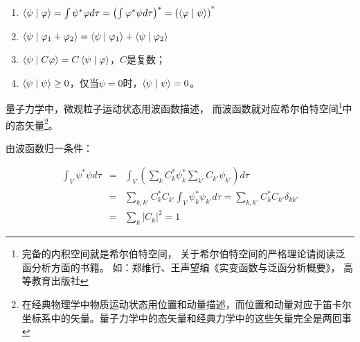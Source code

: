 \begin{enumerate}
    \item $\left\langle {\psi }
 \mathrel{\left | {\vphantom {\psi  \varphi }}
 \right. \kern-\nulldelimiterspace}
 {\varphi } \right\rangle  = \int {\psi ^* \varphi d\tau  = \left( {\int {\varphi ^* \psi d\tau } } \right)^*  = \left( {\left\langle {\varphi }
 \mathrel{\left | {\vphantom {\varphi  \psi }}
 \right. \kern-\nulldelimiterspace}
 {\psi } \right\rangle } \right)} ^* $

    \item $\left\langle {\psi }
 \mathrel{\left | {\vphantom {\psi  {\varphi _1  + \varphi _2 }}}
 \right. \kern-\nulldelimiterspace}
 {{\varphi _1  + \varphi _2 }} \right\rangle  = \left\langle {\psi }
 \mathrel{\left | {\vphantom {\psi  {\varphi _1 }}}
 \right. \kern-\nulldelimiterspace}
 {{\varphi _1 }} \right\rangle  + \left\langle {\psi }
 \mathrel{\left | {\vphantom {\psi  {\varphi _2 }}}
 \right. \kern-\nulldelimiterspace}
 {{\varphi _2 }} \right\rangle $

    \item $\left\langle {\psi }
 \mathrel{\left | {\vphantom {\psi  {C\varphi }}}
 \right. \kern-\nulldelimiterspace}
 {{C\varphi }} \right\rangle  = C\left\langle {\psi }
 \mathrel{\left | {\vphantom {\psi  \varphi }}
 \right. \kern-\nulldelimiterspace}
 {\varphi } \right\rangle $，$C$是复数；

    \item $\left\langle {\psi }
 \mathrel{\left | {\vphantom {\psi  \psi }}
 \right. \kern-\nulldelimiterspace}
 {\psi } \right\rangle  \ge 0$，仅当$\psi  = 0$时，$\left\langle {\psi }
 \mathrel{\left | {\vphantom {\psi  \psi }}
 \right. \kern-\nulldelimiterspace}
 {\psi } \right\rangle  = 0$。
   \end{enumerate}

量子力学中，微观粒子运动状态用波函数描述，
而波函数就对应希尔伯特空间\footnote{完备的内积空间就是希尔伯特空间，
关于希尔伯特空间的严格理论请阅读泛函分析方面的书籍。
如：郑维行、王声望编《实变函数与泛函分析概要》，
高等教育出版社}中的态矢量\footnote{在经典物理学中物质运动状态用位置和动量描述，而位置和动量对应于笛卡尔坐标系中的矢量。量子力学中的态矢量和经典力学中的这些矢量完全是两回事}。

由波函数归一条件：

\begin{eqnarray*}
\int_V \psi ^* \psi d\tau &=& \int_V {\left( {\sum\limits_k {C_k ^* \psi _k ^* \sum\limits_{k'} {C_{k'} \psi _{k'} } } } \right)} d\tau  \\
{} & = & \sum\limits_{k,k'} {C_k ^* C_{k'} } \int_V {\psi _k ^* \psi _{k'} d\tau } =  \sum\limits_{k,k'} {C_k ^* C_{k'} \delta _{kk'} } \\
{} & = & \sum\limits_k \left| {C_k } \right|^2  = 1
\end{eqnarray*}

